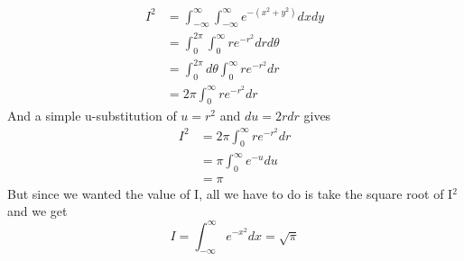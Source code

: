 \documentclass{article}
\newcommand{\be}{\begin{equation}}
\newcommand{\ee}{\end{equation}}
\begin{document}
\be
\begin{split}
	 I^2 &= \int_{-\infty}^\infty \int_{-\infty}^\infty e^{-(x^2 + y^2)} dxdy \\
	 &= \int_0^{2\pi} \int_0^\infty r e^{-r^2} dr d\theta \\
	 &= \int_0^{2\pi} d\theta \int_0^\infty r e^{-r^2} dr \\
	 &= 2\pi \int_0^\infty re^{-r^2} dr
\end{split}
\ee
And a simple u-substitution of $u = r^2$ and $du = 2rdr$ gives
\be
\begin{split}
	 I^2 &= 2\pi \int_0^\infty re^{-r^2} dr \\
	 &= \pi \int_0^\infty e^{-u} du \\
	 &= \pi
\end{split}
\ee
But since we wanted the value of I, all we have to do is take the square root of I$^2$ and we get
\be
I = \int_{-\infty}^\infty e^{-x^2} dx = \sqrt{\pi}
\ee
\end{document}
